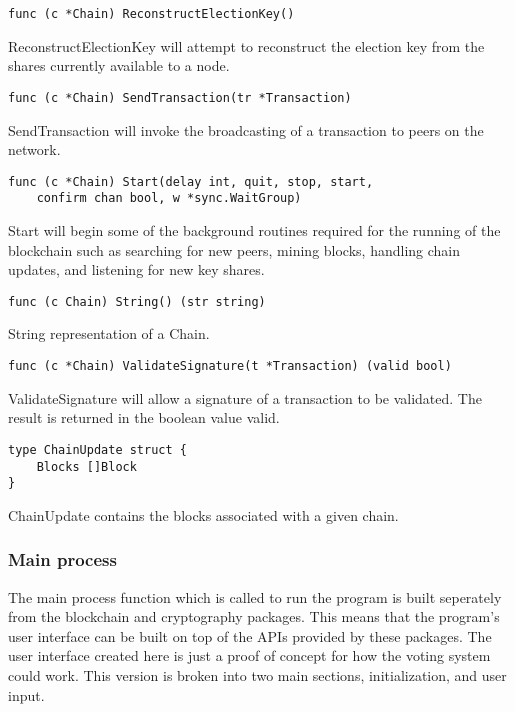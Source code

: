 \documentclass[a4paper,12pt]{article}
\begin{document}
\begin{Verbatim}[obeytabs,tabsize=4]
func (c *Chain) ReconstructElectionKey()
\end{Verbatim}
ReconstructElectionKey will attempt to reconstruct the election key from the shares currently available to a node.

\begin{Verbatim}[obeytabs,tabsize=4]
func (c *Chain) SendTransaction(tr *Transaction)
\end{Verbatim}
SendTransaction will invoke the broadcasting of a transaction to peers on the network.

\begin{Verbatim}[obeytabs,tabsize=4]
func (c *Chain) Start(delay int, quit, stop, start,
    confirm chan bool, w *sync.WaitGroup)
\end{Verbatim}
Start will begin some of the background routines required for the running of the blockchain such as searching for new peers, mining blocks, handling chain updates, and listening for new key shares.

\begin{Verbatim}[obeytabs,tabsize=4]
func (c Chain) String() (str string)
\end{Verbatim}
String representation of a Chain.

\begin{Verbatim}[obeytabs,tabsize=4]
func (c *Chain) ValidateSignature(t *Transaction) (valid bool)
\end{Verbatim}
ValidateSignature will allow a signature of a transaction to be validated. The result is returned in the boolean value valid.

\begin{Verbatim}[obeytabs,tabsize=4]
type ChainUpdate struct {
    Blocks []Block
}
\end{Verbatim}
ChainUpdate contains the blocks associated with a given chain.

\subsubsection{Main process}
The main process function which is called to run the program is built seperately from the blockchain and cryptography packages. This means that the program's user interface can be built on top of the APIs provided by these packages. The user interface created here is just a proof of concept for how the voting system could work. This version is broken into two main sections, initialization, and user input.
\end{document}
